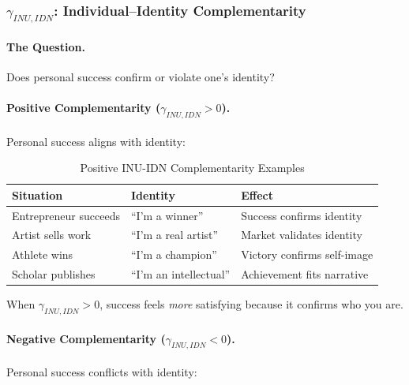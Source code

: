 \subsubsection{$\gamma_{INU,IDN}$: Individual--Identity Complementarity}

\paragraph{The Question.}
Does personal success confirm or violate one's identity?

\paragraph{Positive Complementarity ($\gamma_{INU,IDN} > 0$).}
Personal success aligns with identity:

\begin{table}[htbp]
\centering
\caption{Positive INU-IDN Complementarity Examples}
\label{tab:inu-idn-positive}
\renewcommand{\arraystretch}{1.3}
\begin{tabular}{@{}lll@{}}
\toprule
\textbf{Situation} & \textbf{Identity} & \textbf{Effect} \\
\midrule
Entrepreneur succeeds & ``I'm a winner'' & Success confirms identity \\
Artist sells work & ``I'm a real artist'' & Market validates identity \\
Athlete wins & ``I'm a champion'' & Victory confirms self-image \\
Scholar publishes & ``I'm an intellectual'' & Achievement fits narrative \\
\bottomrule
\end{tabular}
\end{table}

When $\gamma_{INU,IDN} > 0$, success feels \emph{more} satisfying because it 
confirms who you are.

\paragraph{Negative Complementarity ($\gamma_{INU,IDN} < 0$).}
Personal success conflicts with identity:

